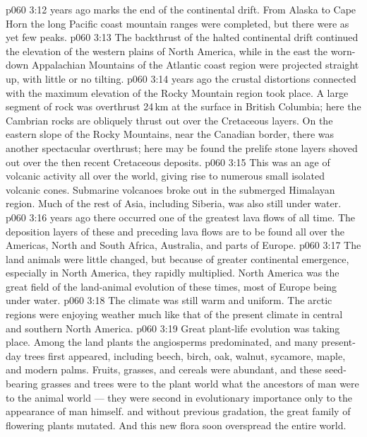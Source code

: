 \vs p060 3:12 \pc {} years ago marks the end of the continental drift. From Alaska to Cape Horn the long Pacific coast mountain ranges were completed, but there were as yet few peaks.
\vs p060 3:13 The backthrust of the halted continental drift continued the elevation of the western plains of North America, while in the east the worn\hyp{}down Appalachian Mountains of the Atlantic coast region were projected straight up, with little or no tilting.
\vs p060 3:14 \pc {} years ago the crustal distortions connected with the maximum elevation of the Rocky Mountain region took place. A large segment of rock was overthrust 24\,km at the surface in British Columbia; here the Cambrian rocks are obliquely thrust out over the Cretaceous layers. On the eastern slope of the Rocky Mountains, near the Canadian border, there was another spectacular overthrust; here may be found the prelife stone layers shoved out over the then recent Cretaceous deposits.
\vs p060 3:15 This was an age of volcanic activity all over the world, giving rise to numerous small isolated volcanic cones. Submarine volcanoes broke out in the submerged Himalayan region. Much of the rest of Asia, including Siberia, was also still under water.
\vs p060 3:16 \pc {} years ago there occurred one of the greatest lava flows of all time. The deposition layers of these and preceding lava flows are to be found all over the Americas, North and South Africa, Australia, and parts of Europe.
\vs p060 3:17 The land animals were little changed, but because of greater continental emergence, especially in North America, they rapidly multiplied. North America was the great field of the land\hyp{}animal evolution of these times, most of Europe being under water.
\vs p060 3:18 The climate was still warm and uniform. The arctic regions were enjoying weather much like that of the present climate in central and southern North America.
\vs p060 3:19 Great plant\hyp{}life evolution was taking place. Among the land plants the angiosperms predominated, and many present\hyp{}day trees first appeared, including beech, birch, oak, walnut, sycamore, maple, and modern palms. Fruits, grasses, and cereals were abundant, and these seed\hyp{}bearing grasses and trees were to the plant world what the ancestors of man were to the animal world --- they were second in evolutionary importance only to the appearance of man himself.  and without previous gradation, the great family of flowering plants mutated. And this new flora soon overspread the entire world.
